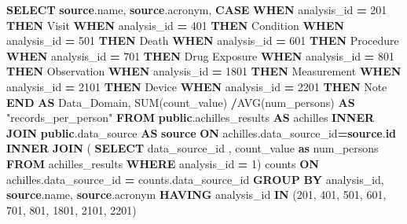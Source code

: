 \documentclass[
]{book}
\newenvironment{Shaded}{\begin{snugshade}}{\end{snugshade}}
\newcommand{\ControlFlowTok}[1]{\textcolor[rgb]{0.13,0.29,0.53}{\textbf{#1}}}
\newcommand{\DecValTok}[1]{\textcolor[rgb]{0.00,0.00,0.81}{#1}}
\newcommand{\FunctionTok}[1]{\textcolor[rgb]{0.00,0.00,0.00}{#1}}
\newcommand{\KeywordTok}[1]{\textcolor[rgb]{0.13,0.29,0.53}{\textbf{#1}}}
\newcommand{\NormalTok}[1]{#1}
\newcommand{\OperatorTok}[1]{\textcolor[rgb]{0.81,0.36,0.00}{\textbf{#1}}}
\newcommand{\OtherTok}[1]{\textcolor[rgb]{0.56,0.35,0.01}{#1}}
\newcommand{\StringTok}[1]{\textcolor[rgb]{0.31,0.60,0.02}{#1}}
\begin{document}
\begin{Shaded}
\begin{Highlighting}[]
\KeywordTok{SELECT} 
    \KeywordTok{source}\NormalTok{.name,}
    \KeywordTok{source}\NormalTok{.acronym,}
    \ControlFlowTok{CASE} 
    \ControlFlowTok{WHEN}\NormalTok{ analysis\_id }\OperatorTok{=} \DecValTok{201} \ControlFlowTok{THEN} \StringTok{\textquotesingle{}Visit\textquotesingle{}}
    \ControlFlowTok{WHEN}\NormalTok{ analysis\_id }\OperatorTok{=} \DecValTok{401} \ControlFlowTok{THEN} \StringTok{\textquotesingle{}Condition\textquotesingle{}}
    \ControlFlowTok{WHEN}\NormalTok{ analysis\_id }\OperatorTok{=} \DecValTok{501} \ControlFlowTok{THEN} \StringTok{\textquotesingle{}Death\textquotesingle{}}
    \ControlFlowTok{WHEN}\NormalTok{ analysis\_id }\OperatorTok{=} \DecValTok{601} \ControlFlowTok{THEN} \StringTok{\textquotesingle{}Procedure\textquotesingle{}}
    \ControlFlowTok{WHEN}\NormalTok{ analysis\_id }\OperatorTok{=} \DecValTok{701} \ControlFlowTok{THEN} \StringTok{\textquotesingle{}Drug Exposure\textquotesingle{}}
    \ControlFlowTok{WHEN}\NormalTok{ analysis\_id }\OperatorTok{=} \DecValTok{801} \ControlFlowTok{THEN} \StringTok{\textquotesingle{}Observation\textquotesingle{}}
    \ControlFlowTok{WHEN}\NormalTok{ analysis\_id }\OperatorTok{=} \DecValTok{1801} \ControlFlowTok{THEN} \StringTok{\textquotesingle{}Measurement\textquotesingle{}}
    \ControlFlowTok{WHEN}\NormalTok{ analysis\_id }\OperatorTok{=} \DecValTok{2101} \ControlFlowTok{THEN} \StringTok{\textquotesingle{}Device\textquotesingle{}}
    \ControlFlowTok{WHEN}\NormalTok{ analysis\_id }\OperatorTok{=} \DecValTok{2201} \ControlFlowTok{THEN} \StringTok{\textquotesingle{}Note\textquotesingle{}}
    \ControlFlowTok{END} \KeywordTok{AS}\NormalTok{ Data\_Domain,}
    \FunctionTok{SUM}\NormalTok{(count\_value) }\OperatorTok{/}\FunctionTok{AVG}\NormalTok{(num\_persons) }\KeywordTok{AS} \OtherTok{"records\_per\_person"}
\KeywordTok{FROM} \KeywordTok{public}\NormalTok{.achilles\_results }\KeywordTok{AS}\NormalTok{ achilles}
\KeywordTok{INNER} \KeywordTok{JOIN} \KeywordTok{public}\NormalTok{.data\_source }\KeywordTok{AS} \KeywordTok{source} \KeywordTok{ON}\NormalTok{ achilles.data\_source\_id}\OperatorTok{=}\KeywordTok{source}\NormalTok{.}\KeywordTok{id}
\KeywordTok{INNER} \KeywordTok{JOIN}\NormalTok{ (}
  \KeywordTok{SELECT}\NormalTok{ data\_source\_id , count\_value }\KeywordTok{as}\NormalTok{ num\_persons}
  \KeywordTok{FROM}\NormalTok{ achilles\_results}
  \KeywordTok{WHERE}\NormalTok{ analysis\_id }\OperatorTok{=} \DecValTok{1}\NormalTok{) counts }\KeywordTok{ON}\NormalTok{ achilles.data\_source\_id }\OperatorTok{=}\NormalTok{ counts.data\_source\_id }
\KeywordTok{GROUP} \KeywordTok{BY}\NormalTok{ analysis\_id, }\KeywordTok{source}\NormalTok{.name, }\KeywordTok{source}\NormalTok{.acronym}
\KeywordTok{HAVING}\NormalTok{ analysis\_id }\KeywordTok{IN}\NormalTok{ (}\DecValTok{201}\NormalTok{, }\DecValTok{401}\NormalTok{, }\DecValTok{501}\NormalTok{, }\DecValTok{601}\NormalTok{, }\DecValTok{701}\NormalTok{, }\DecValTok{801}\NormalTok{, }\DecValTok{1801}\NormalTok{, }\DecValTok{2101}\NormalTok{, }\DecValTok{2201}\NormalTok{)}
\end{Highlighting}
\end{Shaded}
\end{document}
